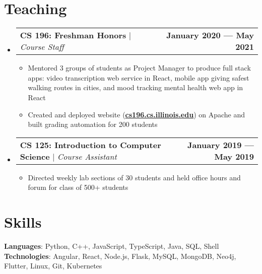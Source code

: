 \documentclass[letterpaper,11pt]{article}
\makeatletter
\newcommand{\resumeItem}[1]{
  \item\small{
    {#1 \vspace{-2pt}}
  }
}
\newcommand{\resumeProjectHeading}[2]{
    \item
    \begin{tabular*}{1\textwidth}{l@{\extracolsep{\fill}}r}
      \small#1 & \small{\textbf{#2}} \\
    \end{tabular*}\vspace{-7pt}
}
\newcommand{\resumeSubHeadingListStart}{\begin{itemize}[leftmargin=0in, label={}]}
\newcommand{\resumeSubHeadingListEnd}{\end{itemize}}
\newcommand{\resumeItemListStart}{\begin{itemize}}
\newcommand{\resumeItemListEnd}{\end{itemize}\vspace{-5pt}}
\makeatother
\begin{document}
\section{Teaching}
    \resumeSubHeadingListStart
      \resumeProjectHeading
          {\textbf{CS 196: Freshman Honors} $|$ \emph{Course Staff}}{January 2020 --- May 2021}
          \resumeItemListStart
            \resumeItem{Mentored 3 groups of students as Project Manager to produce full stack apps: video transcription web service in React, mobile app giving safest walking routes in cities, and mood tracking mental health web app in React}
            \resumeItem{ Created and deployed website (\textbf{\href{http://cs196.cs.illinois.edu}{cs196.cs.illinois.edu}}) on Apache and built grading automation for 200 students}
          \resumeItemListEnd
      \resumeProjectHeading
          {\textbf{CS 125: Introduction to Computer Science} $|$ \emph{Course Assistant}}{January 2019 --- May 2019}
          \resumeItemListStart
            \resumeItem{  Directed weekly lab sections of 30 students and held office hours and forum for class of 500+ students }
           
          \resumeItemListEnd
    \resumeSubHeadingListEnd


\section{Skills}
 \begin{itemize}[leftmargin=0in, label={}]
    \small{\item{
     \textbf{Languages}{: Python, C++, JavaScript, TypeScript, Java, SQL, Shell} \\
         \textbf{Technologies}{: Angular, React, Node.js, Flask, MySQL, MongoDB, Neo4j, Flutter, Linux, Git, Kubernetes}}}
 \end{itemize}

\end{document}
